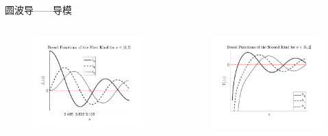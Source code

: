 \begin{frame}{圆波导——导模}
    \begin{columns}
        \begin{column}{0.5\linewidth}
            \begin{figure}
                \includegraphics[width=6cm]{Cha6//fig6-19.pdf}
            \end{figure}
        \end{column}
        \begin{column}{0.5\linewidth}
            \begin{figure}
                \includegraphics[width=6cm]{Cha6//fig6-19-2.pdf}
            \end{figure}
        \end{column}
    \end{columns}
\end{frame}

